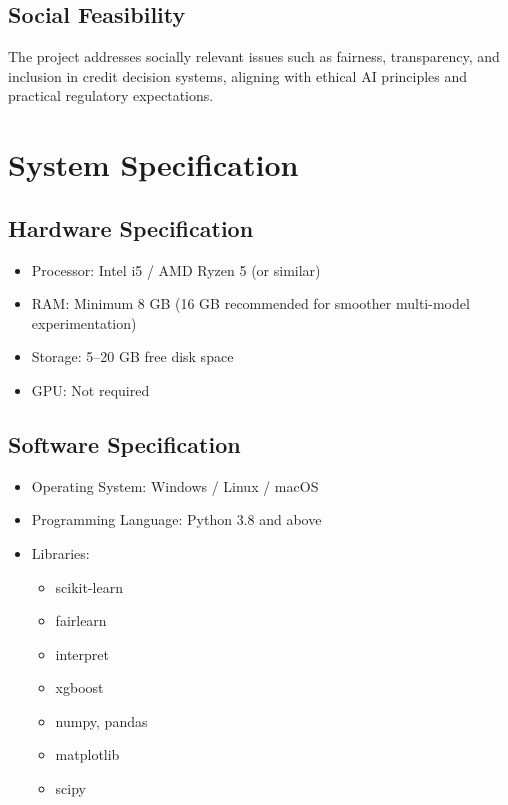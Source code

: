\subsection{Social Feasibility}
The project addresses socially relevant issues such as fairness, transparency, and inclusion in credit decision systems, aligning with ethical AI principles and practical regulatory expectations.


\section{System Specification}

\subsection{Hardware Specification}
\begin{itemize}
    \item Processor: Intel i5 / AMD Ryzen 5 (or similar)
    \item RAM: Minimum 8 GB (16 GB recommended for smoother multi-model experimentation)
    \item Storage: 5--20 GB free disk space
    \item GPU: Not required
\end{itemize}

\subsection{Software Specification}
\begin{itemize}
    \item Operating System: Windows / Linux / macOS
    \item Programming Language: Python 3.8 and above
    \item Libraries:
    \begin{itemize}
        \item scikit-learn
        \item fairlearn
        \item interpret
        \item xgboost
        \item numpy, pandas
        \item matplotlib
        \item scipy
    \end{itemize}
\end{itemize}